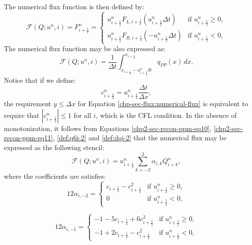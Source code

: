 The numerical flux function is then defined by:
\begin{equation}
	\label{chp-sec-flux:numerical-flux}
	\mathcal{F}(Q;u^n,i) = F_{i+\frac{1}{2}}^n =  
    	\begin{cases}
		u_{i+\frac{1}{2}}^nF_{L,i+\frac{1}{2}}( u_{i+\frac{1}{2}}^n\Delta t) & \text{if } u_{i+\frac{1}{2}}^n \geq 0,\\
		u_{i+\frac{1}{2}}^nF_{R,i+\frac{1}{2}}(-u_{i+\frac{1}{2}}^n\Delta t) & \text{if } u_{i+\frac{1}{2}}^n<0,
    	\end{cases}
\end{equation}
The numerical flux function may be also expressed as:
\begin{equation}
	\label{chp-sec-flux:numerical-flux2}
	\mathcal{F}(Q;u^n,i) =  \frac{1}{\Delta t} 
	\int_{x_{i+\frac{1}{2}}-u^n_{i+\frac{1}{2}}\delta t}^{x_{i+\frac{1}{2}}}
	q_{PP}(x) \,dx.
\end{equation}
Notice that if we define:
\begin{equation*}
	\label{chp-sec-flux:cedges}
	c_{i+\frac{1}{2}}^n = u_{i+\frac{1}{2}}^n\frac{\Delta t}{\Delta x},
\end{equation*}
the requirement $y\leq \Delta x$ for 
Equation \eqref{chp-sec-flux:numerical-flux} is equivalent
to require that $|c^{n}_{i+\frac{1}{2}}| \leq 1$ for all $i$,  which is the CFL condition.
In the absence of monotonization, it follows from Equations
\eqref{chp2-sec-recon-ppm-eq10}, \eqref{chp2-sec-recon-ppm-eq11},
\eqref{def:q6i-2} and \eqref{def:dqi-2}
that the numerical flux may be expressed as the following stencil:
\begin{equation*}
	\label{chp-sec-flux:numerical-flux-stencil}
	\mathcal{F}(Q;u^n,i) = u_{i+\frac{1}{2}}^n
	\sum_{k=-2}^{3} \alpha_{i,k}Q_{i+k}^n,
\end{equation*}
where the coefficients are satisfies:
\begin{equation*}
	12\alpha_{i,-2} =  
    	\begin{cases}
		c_{i+\frac{1}{2}}-c_{i+\frac{1}{2}}^2 &
		\text{if } u_{i+\frac{1}{2}}^n \geq 0,\\
		0 & \text{if } u_{i+\frac{1}{2}}^n<0,
    	\end{cases}
\end{equation*}

\begin{equation*}
	12\alpha_{i,-1} =  
    	\begin{cases}
		-1 - 5c_{i+\frac{1}{2}}  + 6c_{i+\frac{1}{2}}^2 
		& \text{if } u_{i+\frac{1}{2}}^n \geq 0,\\
		-1 +  2c_{i+\frac{1}{2}}   -   c_{i+\frac{1}{2}}^2 & \text{if } u_{i+\frac{1}{2}}^n<0,
    	\end{cases}
\end{equation*}

